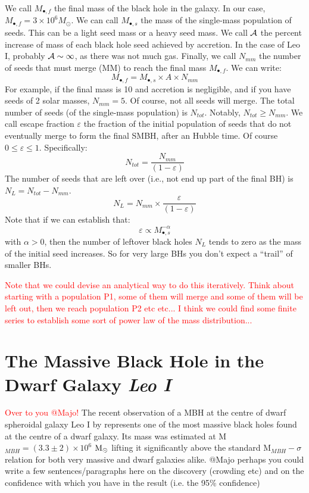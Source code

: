 \documentclass[twocolumn, tighten]{aastex631}
\newcommand{\msolar} {$\rm{M_{\odot}}~$}
\begin{document}
We call $M_{\bullet, f}$ the final mass of the black hole in the galaxy. In our case, $M_{\bullet, f} = 3\times 10^6 M_\odot$. We can call $M_{\bullet, s}$ the mass of the single-mass population of seeds. This can be a light seed mass or a heavy seed mass. We call $\cal{A}$ the percent increase of mass of each black hole seed achieved by accretion. In the case of Leo I, probably $\cal{A} \sim 1$, as there was not much gas. Finally, we call $N_{mm}$ the number of seeds that must merge (MM) to reach the final mass $M_{\bullet, f}$. We can write:
\begin{equation}
    M_{\bullet, f} = M_{\bullet, s} \times A \times N_{mm}
\end{equation}
For example, if the final mass is 10 and accretion is negligible, and if you have seeds of 2 solar masses, $N_{mm} = 5$.
Of course, not all seeds will merge. The total number of seeds (of the single-mass population) is $N_{tot}$. Notably, $N_{tot} \geq N_{mm}$.
We call escape fraction $\varepsilon$ the fraction of the initial population of seeds that do not eventually merge to form the final SMBH, after an Hubble time. Of course $0 \leq \varepsilon \leq 1$. Specifically:
\begin{equation}
    N_{tot} = \frac{N_{mm}}{(1-\varepsilon)}
\end{equation}
The number of seeds that are left over (i.e., not end up part of the final BH) is $N_L = N_{tot} - N_{mm}$.
\begin{equation}
    N_L = N_{mm} \times \frac{\varepsilon}{(1-\varepsilon)}
\end{equation}
Note that if we can establish that:
\begin{equation}
    \varepsilon \propto M_{\bullet, s}^{-\alpha}
\end{equation}
with $\alpha > 0$, then the number of leftover black holes $N_L$ tends to zero as the mass of the initial seed increases.
So for very large BHs you don't expect a ``trail'' of smaller BHs.

\textcolor{red}{Note that we could devise an analytical way to do this iteratively. Think about starting with a population P1, some of them will merge and some of them will be left out, then we reach population P2 etc etc... I think we could find some finite series to establish some sort of power law of the mass distribution...}


\section{The Massive Black Hole in the Dwarf Galaxy \textit{Leo I}} \label{Sec:LeoI}
\noindent \textcolor{red}{Over to you @Majo!}
The recent observation of a MBH at the centre of dwarf spheroidal galaxy Leo I by \cite{Bustamante-Rosell_2021} represents one of the most massive black holes found at the centre of
a dwarf galaxy. Its mass was estimated at M$_{MBH} = (3.3 \pm 2) \times 10^6$ \msolar lifting
it significantly above the standard M$_{MBH} - \sigma$ relation \citep{Kormendy_2013, Baldassare_2020, Greene_2020} for both very massive and dwarf galaxies alike. 
@Majo perhaps you could write a few sentences/paragraphs here on the discovery (crowding etc) and on the 
confidence with which you have in the result (i.e. the 95\% confidence)
\end{document}
